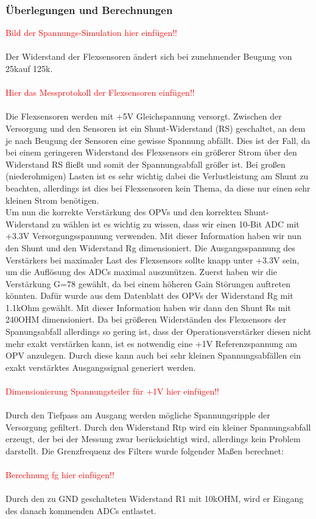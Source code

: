 \documentclass[11pt]{article}
\begin{document}
\subsubsection{Überlegungen und Berechnungen}

\textcolor{red}{Bild der Spannungs-Simulation hier einfügen!!}\\
\\
Der Widerstand der Flexsensoren ändert sich bei zunehmender Beugung von 25k\textOmega auf 125k\textOmega.\\
\\
\textcolor{red}{Hier das Messprotokoll der Flexsensoren einfügen!!}\\
\\
Die Flexsensoren werden mit +5V Gleichspannung versorgt. Zwischen der Versorgung und den Sensoren ist ein Shunt-Widerstand 
(RS) geschaltet, an dem je nach Beugung der Sensoren eine gewisse Spannung abfällt. Dies ist der Fall, da bei einem 
geringeren Widerstand des Flexsensors ein größerer Strom über den Widerstand RS fließt und somit der Spannungsabfall größer 
ist. Bei großen (niederohmigen) Lasten ist es sehr wichtig dabei die Verlustleistung am Shunt zu beachten, allerdings ist 
dies bei Flexsensoren kein Thema, da diese nur einen sehr kleinen Strom benötigen.
\\
Um nun die korrekte Verstärkung des OPVs und den korrekten Shunt-Widerstand zu wählen ist es wichtig zu wissen, dass wir 
einen 10-Bit ADC mit +3.3V Versorgungsspannung verwenden. Mit dieser Information haben wir nun den Shunt und den Widerstand 
Rg dimensioniert. Die Ausgangsspannung des Verstärkers bei maximaler Last des Flexsensors sollte knapp unter +3.3V sein, 
um die Auflösung des ADCs maximal auszunützen. Zuerst haben wir die Verstärkung G=78 gewählt, da bei einem höheren Gain 
Störungen auftreten könnten. Dafür wurde aus dem Datenblatt des OPVs der Widerstand Rg mit 1.1kOhm gewählt. Mit dieser 
Information haben wir dann den Shunt Rs mit 240OHM dimensioniert. Da bei größeren Widerständen des Flexsensors der 
Spanungsabfall allerdings so gering ist, dass der Operationsverstärker diesen nicht mehr exakt verstärken kann, ist es 
notwendig eine +1V Referenzspannung am OPV anzulegen. Durch diese kann auch bei sehr kleinen Spannungsabfällen ein exakt 
verstärktes Ausgangssignal generiert werden.\\
\\
\textcolor{red}{Dimensionierung Spannungsteiler für +1V hier einfügen!!}\\
\\
Durch den Tiefpass am Ausgang werden mögliche Spannungsripple der Versorgung gefiltert. Durch den Widerstand Rtp wird 
ein kleiner Spannungsabfall erzeugt, der bei der Messung zwar berücksichtigt wird, allerdings kein Problem darstellt. 
Die Grenzfrequenz des Filters wurde folgender Maßen berechnet:\\
\\
\textcolor{red}{Berechnung fg hier einfügen!!}\\
\\
Durch den zu GND geschalteten Widerstand R1 mit 10kOHM, wird er Eingang des danach kommenden ADCs entlastet. 
\end{document}
